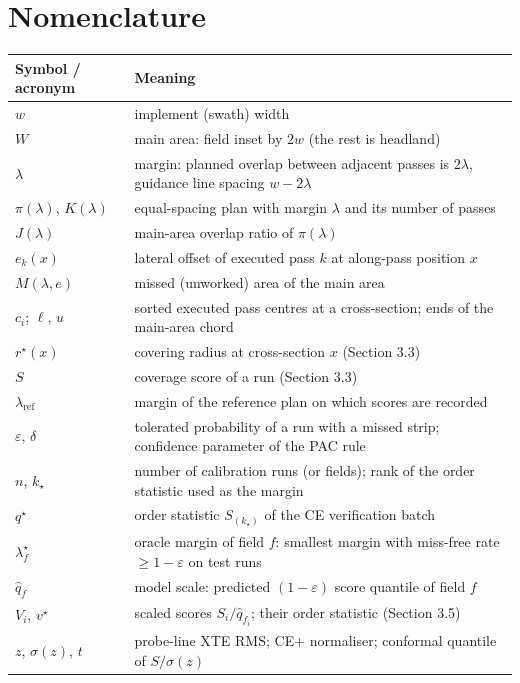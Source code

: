 \documentclass[preprint,12pt,authoryear]{elsarticle}
\begin{document}
\section*{Nomenclature}
{\footnotesize
\begin{tabularx}{\textwidth}{@{}>{\raggedright\arraybackslash}p{}X@{}}
\toprule
\textbf{Symbol / acronym} & \textbf{Meaning} \\
\midrule
\(w\) & implement (swath) width \\
\(W\) & main area: field inset by \(2w\) (the rest is headland) \\
\(\lambda\) & margin: planned overlap between adjacent passes is \(2\lambda\), guidance line spacing \(w-2\lambda\) \\
\(\pi(\lambda)\), \(K(\lambda)\) & equal-spacing plan with margin \(\lambda\) and its number of passes \\
\(J(\lambda)\) & main-area overlap ratio of \(\pi(\lambda)\) \\
\(e_k(x)\) & lateral offset of executed pass \(k\) at along-pass position \(x\) \\
\(M(\lambda,e)\) & missed (unworked) area of the main area \\
\(c_i\); \(\ell\), \(u\) & sorted executed pass centres at a cross-section; ends of the main-area chord \\
\(r^\star(x)\) & covering radius at cross-section \(x\) (Section 3.3) \\
\(S\) & coverage score of a run (Section 3.3) \\
\(\lambda_\mathrm{ref}\) & margin of the reference plan on which scores are recorded \\
\(\varepsilon\), \(\delta\) & tolerated probability of a run with a missed strip; confidence parameter of the PAC rule \\
\(n\), \(k_\star\) & number of calibration runs (or fields); rank of the order statistic used as the margin \\
\(q^\star\) & order statistic \(S_{(k_\star)}\) of the CE verification batch \\
\(\lambda^\star_f\) & oracle margin of field \(f\): smallest margin with miss-free rate \(\ge1-\varepsilon\) on test runs \\
\(\hat q_f\) & model scale: predicted \((1-\varepsilon)\) score quantile of field \(f\) \\
\(V_i\), \(v^\star\) & scaled scores \(S_i/\hat q_{f_i}\); their order statistic (Section 3.5) \\
\(z\), \(\sigma(z)\), \(t\) & probe-line XTE RMS; CE+ normaliser; conformal quantile of \(S/\sigma(z)\) \\

\end{tabularx}}
\end{document}
